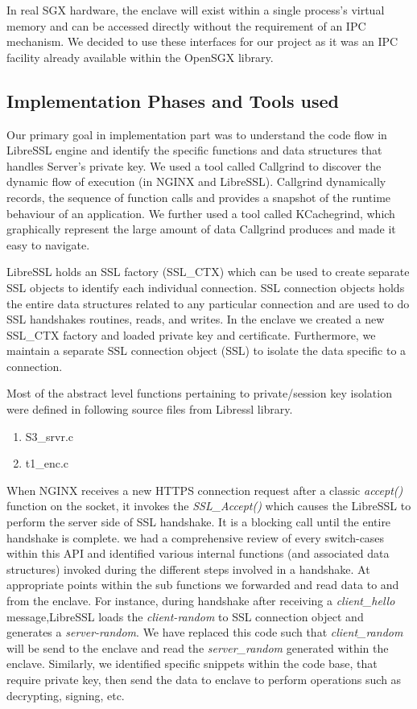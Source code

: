\documentclass[../main.tex]{subfiles}
\begin{document}
In real SGX hardware, the enclave will exist within a single process's virtual
memory and can be accessed directly without the requirement of an IPC
mechanism. We decided to use these interfaces for our project as it was an IPC
facility already available within the OpenSGX library.

\subsection{Implementation Phases and Tools used}
Our primary goal in implementation part was to understand the code flow in LibreSSL
engine and identify the specific functions and data structures that handles Server’s 
private key. We used a tool called Callgrind to discover the dynamic flow of execution 
(in NGINX and LibreSSL). Callgrind dynamically records, the sequence of function calls 
and provides a snapshot of the runtime behaviour of an application. We further used a
tool called KCachegrind, which graphically represent the large amount of data 
Callgrind produces and made it easy to navigate.
 
LibreSSL holds an SSL factory (SSL\_CTX) which can be used to create separate SSL objects
to identify each individual connection. SSL connection objects holds the entire 
data structures related to any particular connection and are used to do SSL handshakes
routines, reads, and writes. In the enclave we created a new SSL\_CTX factory and loaded
private key and certificate. Furthermore, we maintain a separate SSL connection object (SSL)
to isolate the data specific to a connection.   
 
Most of the abstract level functions pertaining to private/session key isolation were defined  
in following source files from Libressl library.
\begin{enumerate}
  \item S3\_srvr.c
  \item t1\_enc.c
\end{enumerate}
 
When NGINX receives a new HTTPS connection request after a classic \textit{accept()} function 
on the socket, it invokes the \textit{SSL\_Accept()} which causes the LibreSSL to perform the 
server side of SSL handshake. It is a blocking call until the entire handshake is complete. 
we had a comprehensive review of every switch-cases within this API and identified various 
internal functions (and associated data structures) invoked during the different steps 
involved in a handshake. At appropriate points within the sub functions we forwarded and read 
data to and from the enclave. For instance, during handshake after receiving a \textit{client\_hello}
message,LibreSSL loads the \textit{client-random} to SSL connection object and generates a \textit{server-random}. 
We have replaced this code such that \textit{client\_random} will be send to the enclave and read
the \textit{server\_random} generated within the enclave. Similarly, we identified specific snippets within
the code base, that require private key, then send the data to enclave to perform operations such as 
decrypting, signing, etc. 
\end{document}
